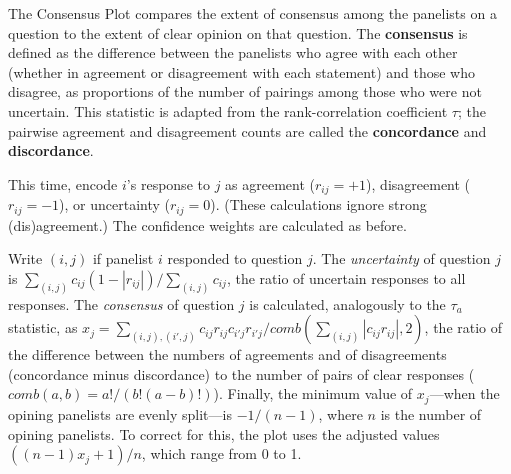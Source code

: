 \documentclass{article}
\begin{document}
The Consensus Plot compares the extent of consensus among the panelists on a question to the extent of clear opinion on that question. The {\bf consensus} is defined as the difference between the panelists who agree with each other (whether in agreement or disagreement with each statement) and those who disagree, as proportions of the number of pairings among those who were not uncertain. This statistic is adapted from the rank-correlation coefficient \(\tau\); the pairwise agreement and disagreement counts are called the {\bf concordance} and {\bf discordance}.

This time, encode \(i\)'s response to \(j\) as agreement (\(r_{ij}=+1\)), disagreement (\(r_{ij}=-1\)), or uncertainty (\(r_{ij}=0\)). (These calculations ignore strong (dis)agreement.) The confidence weights are calculated as before.

Write \((i,j)\) if panelist \(i\) responded to question \(j\). The {\em uncertainty} of question \(j\) is \(\sum_{(i,j)}{c_{ij}(1-|r_{ij}|)}/\sum_{(i,j)}{c_{ij}}\), the ratio of uncertain responses to all responses. The {\em consensus} of question \(j\) is calculated, analogously to the \(\tau_a\) statistic, as \(x_j=\sum_{(i,j),(i',j)}{c_{ij}r_{ij}c_{i'j}r_{i'j}}/{comb(\sum_{(i,j)}{|c_{ij}r_{ij}|},2)}\), the ratio of the difference between the numbers of agreements and of disagreements (concordance minus discordance) to the number of pairs of clear responses (\(comb(a,b)=a!/(b!(a-b)!)\)). Finally, the minimum value of \(x_j\)---when the opining panelists are evenly split---is \(-1/(n-1)\), where \(n\) is the number of opining panelists. To correct for this, the plot uses the adjusted values \(((n-1)x_j+1)/n\), which range from 0 to 1.
\end{document}
